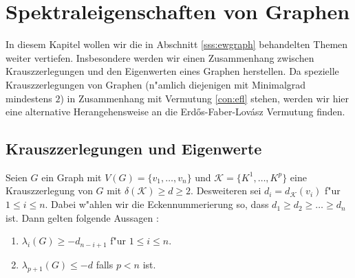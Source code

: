 \section{Spektraleigenschaften von Graphen}

In diesem Kapitel wollen wir die in Abschnitt \ref{sss:ewgraph} behandelten Themen weiter vertiefen. Insbesondere werden wir einen Zusammenhang zwischen Krauszzerlegungen und den Eigenwerten eines Graphen herstellen. Da spezielle Krauszzerlegungen von Graphen (n"amlich diejenigen mit Minimalgrad mindestens $2$) in Zusammenhang mit Vermutung \ref{con:efl} stehen, werden wir hier eine alternative Herangehensweise an die Erd\H{o}s-Faber-Lov\'asz Vermutung finden.
\subsection{Krauszzerlegungen und Eigenwerte}
\begin{theorem}
  \label{thm:KrauszEigenwerte}
  Seien $G$ ein Graph mit $V(G)=\{v_1,\dots,v_n\}$ und $\mathcal K=\{K^1,\dots,K^p\}$ eine Krauszzerlegung von $G$ mit $\delta(\mathcal K) \geq d \geq 2$. Desweiteren sei $d_i = d_{\mathcal{K}}(v_{i})$ f"ur $1\leq i \leq n$. 
  Dabei w"ahlen wir die Eckennummerierung so, dass $d_1 \geq d_2 \geq \dots \geq d_{n}$ ist.
  Dann gelten folgende Aussagen : 
  \begin{enumerate}[label=\rm{(\alph*)}]
    \item $\lambda_i(G) \geq -d_{n-i+1}$ f"ur $1\leq i \leq n$.
    \item $\lambda_{p+1}(G) \leq -d$ falls $p < n$ ist.
  \end{enumerate}
\end{theorem}

